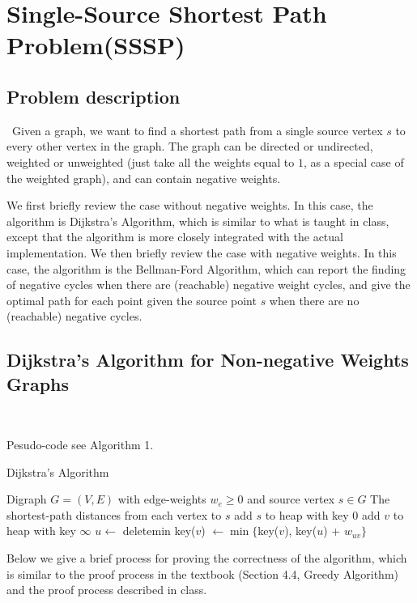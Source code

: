 \documentclass[11pt]{article}
\theoremstyle{plain}
\begin{document}
\section{Single-Source Shortest Path Problem(SSSP)}
\subsection{Problem description}\
Given a graph, we want to find a shortest path from a single source vertex $s$ to every other vertex 
in the graph. The graph can be directed or undirected, weighted or unweighted (just take all the 
weights equal to $1$, as a special case of the weighted graph), and can contain negative weights.

We first briefly review the case without negative weights. In this case, the algorithm is Dijkstra's 
Algorithm, which is similar to what is taught in class, except that the algorithm is more closely 
integrated with the actual implementation. We then briefly review the case with negative weights. 
In this case, the algorithm is the Bellman-Ford Algorithm, which can report the finding of negative 
cycles when there are (reachable) negative weight cycles, and give the optimal path for each point 
given the source point $s$ when there are no (reachable) negative cycles.

\subsection{Dijkstra's Algorithm for Non-negative Weights Graphs}\

Pesudo-code see Algorithm 1.

\begin{algorithm}
  \caption{Dijkstra's Algorithm}
  \begin{algorithmic}[1]
  \REQUIRE Digraph $G = (V, E)$ with edge-weights $w_e \geq 0$ and source vertex $s \in G$
  \ENSURE The shortest-path distances from each vertex to $s$
  \STATE add $s$ to heap with key $0$
      \STATE add $v$ to heap with key $\infty$
  \ENDFOR
      \STATE $u \leftarrow$ deletemin
          \STATE key($v$) $\leftarrow \min\{$key($v$), key($u$) + $w_{uv}\}$ 
      \ENDFOR
  \ENDWHILE
  \end{algorithmic}
  \end{algorithm}

  Below we give a brief process for proving the correctness of the algorithm, which is similar to 
  the proof process in the textbook (Section 4.4, Greedy Algorithm) and the proof process described in class.
\end{document}
